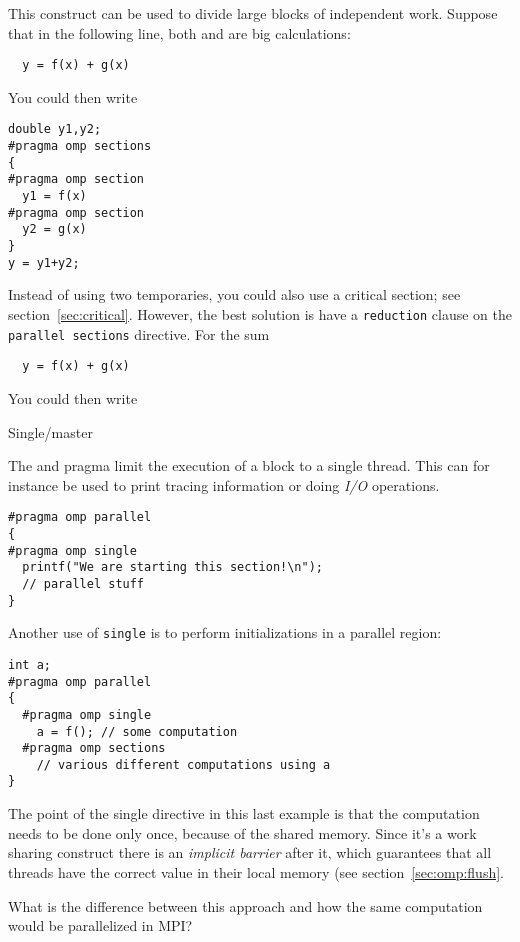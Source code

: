 This construct can be used to divide large blocks of independent work.
Suppose that in the following line, both  and 
are big calculations:
\begin{lstlisting}
  y = f(x) + g(x)
\end{lstlisting}
You could then write
\begin{lstlisting}
double y1,y2;
#pragma omp sections
{
#pragma omp section
  y1 = f(x)
#pragma omp section
  y2 = g(x)
}
y = y1+y2;
\end{lstlisting}
Instead of using two temporaries, you could also use a critical
section; see section~\ref{sec:critical}.  However, the best solution
is have a \lstinline{reduction} clause on the \lstinline{parallel sections} directive.
For the sum
\begin{lstlisting}
  y = f(x) + g(x)
\end{lstlisting}
You could then write

 {Single/master}
\label{sec:omp-single}

The  and  pragma
limit the execution of a block to a single thread. 
This can for instance be used to print tracing information
or doing \emph{I/O} operations.
\begin{lstlisting}
#pragma omp parallel
{
#pragma omp single
  printf("We are starting this section!\n");
  // parallel stuff
}
\end{lstlisting}
Another use of \lstinline{single} is to perform initializations
in a parallel region:
\begin{lstlisting}
int a;
#pragma omp parallel
{
  #pragma omp single
    a = f(); // some computation
  #pragma omp sections
    // various different computations using a
}
\end{lstlisting}

The point of the single directive in this last example is that the
computation needs to be done only once, because of the shared memory.
Since it's a work sharing construct there is an \emph{implicit
  barrier} after it,
which guarantees that all threads have the correct value in their
local memory (see section~\ref{sec:omp:flush}.

\begin{exercise}
  \label{ex:omp-single-mpi}
  What is the difference between this approach and how the same
  computation would be parallelized in MPI?
\end{exercise}

